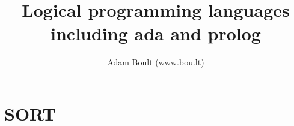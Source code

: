\documentclass[oneside]{book}
\begin{document}
\author{Adam Boult (www.bou.lt)}
\title{Logical programming languages including ada and prolog}
\maketitle

\setcounter{tocdepth}{0}
\tableofcontents



\part{SORT}

\end{document}
